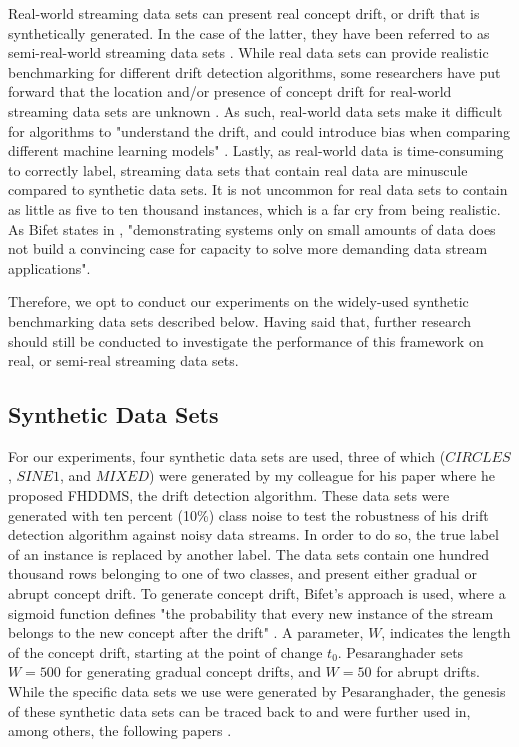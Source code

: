 Real-world streaming data sets can present real concept drift, or drift that is synthetically generated. In the case of the latter, they have been referred to as semi-real-world streaming data sets \cite[42]{pesaranghader2018reservoirthesis}. While real data sets can provide realistic benchmarking for different drift detection algorithms, some researchers have put forward that the location and/or presence of concept drift for real-world streaming data sets are unknown \cite{bifet2007learning, bifet2009new,frias2015online,huang2015drift}. As such, real-world data sets make it difficult for algorithms to "understand the drift, and could introduce bias when comparing different machine learning models" \cite[13]{lu2018learning}. Lastly, as real-world data is time-consuming to correctly label, streaming data sets that contain real data are minuscule compared to synthetic data sets. It is not uncommon for real data sets to contain as little as five to ten thousand instances, which is a far cry from being realistic. As Bifet states in \cite{bifet2009new}, "demonstrating systems only on small amounts of data does not build a convincing case for capacity to solve more demanding data stream applications".

Therefore, we opt to conduct our experiments on the widely-used synthetic benchmarking data sets described below. Having said that, further research should still be conducted to investigate the performance of this framework on real, or semi-real streaming data sets.

\subsection{Synthetic Data Sets}

For our experiments, four synthetic data sets are used, three of which ($CIRCLES$, $SINE1$, and $MIXED$) were generated by my colleague for his paper \cite{pesaranghader2016fast} where he proposed FHDDMS, the drift detection algorithm. These data sets were generated with ten percent (10\%) class noise to test the robustness of his drift detection algorithm against noisy data streams. In order to do so, the true label of an instance is replaced by another label. The data sets contain one hundred thousand rows belonging to one of two classes, and present either gradual or abrupt concept drift. To generate concept drift, Bifet's approach is used, where a sigmoid function defines "the probability that every new instance of the stream belongs to the new concept after the drift" \cite{bifet2009new}. A parameter, $W$, indicates the length of the concept drift, starting at the point of change $t_0$. Pesaranghader sets $W=500$ for generating gradual concept drifts, and $W=50$ for abrupt drifts.
While the specific data sets we use were generated by Pesaranghader, the genesis of these synthetic data sets can be traced back to \cite{10.1007/3-540-59286-5_74} and were further used in, among others, the following papers \cite{baena2006early,bifet2007learning,gama2004learning,nishida2007detecting,olorunnimbe2015intelligent}. 

